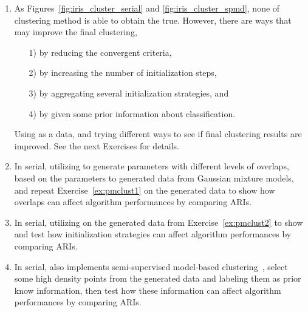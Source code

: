 \begin{enumerate}[label=\thechapter-\arabic*]

\item
As Figures~\ref{fig:iris_cluster_serial} and \ref{fig:iris_cluster_spmd},
none of clustering method is able to obtain the true. However, there are
ways that may improve the final clustering,
\begin{itemize}
\item[1)] by reducing the convergent criteria,
\item[2)] by increasing the number of initialization steps,
\item[3)] by aggregating several initialization strategies, and
\item[4)] by given some prior information about classification.
\end{itemize}
Using  as a data, and trying different ways to see if
final clustering results are improved.
See the next Exercises for details.
\label{ex:pmclust1}

\item
In serial,
utilizing  to generate parameters with different levels of
overlaps, based on the parameters to generated data from Gaussian mixture
models, and repeat Exercise~\ref{ex:pmclust1} on the generated data
to show how overlaps can affect algorithm performances by comparing ARIs.
\label{ex:pmclust2}

\item
In serial,
utilizing  on the generated data from Exercise~\ref{ex:pmclust2}
to show and test how initialization strategies can affect algorithm
performances by comparing ARIs.

\item
In serial,
 also implements semi-supervised model-based
clustering~, select some high density points
from the generated data and labeling them as prior know information, then
test how these information can affect algorithm performances
by comparing ARIs.

\end{enumerate}

